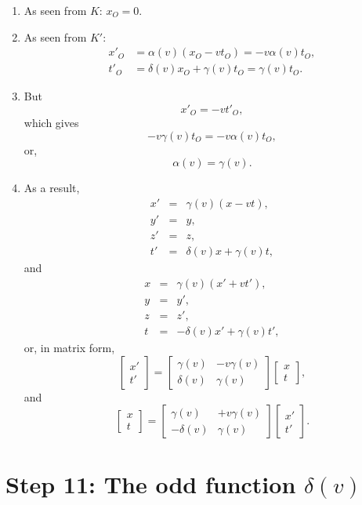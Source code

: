 \documentclass[twocolumn,preprintnumbers,amsmath,amssymb,final]{revtex4}
\def\BEq{\begin{equation}}
\def\EEq{\end{equation}}
\def\BEqA{\begin{eqnarray}}
\def\EEqA{\end{eqnarray}}
\def\a{\alpha}
\def\d{\delta}
\def\g{\gamma}
\begin{document}
\begin{enumerate}

\item As seen from $K$: $x_{O}=0$.

\item As seen from $K'$: 
\begin{align}
x'_{O} &= \a(v)(x_{O}-vt_{O})=-v\a(v)t_{O},
\\
t'_{O}&= \d(v)x_{O}+\g(v)t_{O}=\g(v)t_{O}.
\end{align} 

\item But 
\BEq
x'_{O}= - v t'_{O},
\EEq 
which gives 
\BEq
- v \g(v)t_{O}=-v\a(v)t_{O}, 
\EEq
or,
\BEq
\a(v) = \g(v).
\EEq

\item
As a result,
\BEqA
x'&=&\g(v)(x - vt),
\\
y'&=&y,
\\
z'&=&z,
\\
t'&=&\d(v)x+\g(v)t,
\EEqA
and 
\BEqA
{x}&=&\g(v)({x}' + vt'),
\\
{y}&=&{y'},
\\
z&=&z',
\\
t&=&-\d(v){x}'+\g(v)t',
\EEqA
or, in matrix form,
\BEq
\begin{bmatrix}
x' \\ t'
\end{bmatrix}
=
\begin{bmatrix}
\g(v) & -v\g(v)  \\
\d(v) & \g(v)
\end{bmatrix}
\begin{bmatrix}
x \\ t
\end{bmatrix},
\EEq
and
\BEq
\begin{bmatrix}
x \\ t
\end{bmatrix}
=
\begin{bmatrix}
\g(v) & +v\g(v)  \\
-\d(v) & \g(v)
\end{bmatrix}
\begin{bmatrix}
x' \\ t'
\end{bmatrix}.
\EEq

\end{enumerate}


\section*{Step 11: The odd function $\d(v)$}
 
\end{document}
